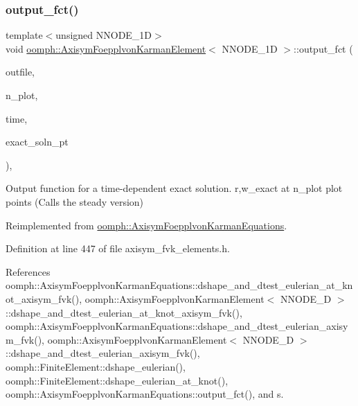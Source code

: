 \subsubsection{\texorpdfstring{output\+\_\+fct()}{output\_fct()}\hspace{0.1cm}{\footnotesize\ttfamily [2/4]}}
{\footnotesize\ttfamily template$<$unsigned N\+N\+O\+D\+E\+\_\+1D$>$ \\
void \hyperlink{classoomph_1_1AxisymFoepplvonKarmanElement}{oomph\+::\+Axisym\+Foepplvon\+Karman\+Element}$<$ N\+N\+O\+D\+E\+\_\+1D $>$\+::output\+\_\+fct (\begin{DoxyParamCaption}\item[{std\+::ostream \&}]{outfile,  }\item[{const unsigned \&}]{n\+\_\+plot,  }\item[{const double \&}]{time,  }\item[{\hyperlink{classoomph_1_1FiniteElement_ad4ecf2b61b158a4b4d351a60d23c633e}{Finite\+Element\+::\+Unsteady\+Exact\+Solution\+Fct\+Pt}}]{exact\+\_\+soln\+\_\+pt }\end{DoxyParamCaption})\hspace{0.3cm}{\ttfamily [inline]}, {\ttfamily [virtual]}}



Output function for a time-\/dependent exact solution. r,w\+\_\+exact at n\+\_\+plot plot points (Calls the steady version) 



Reimplemented from \hyperlink{classoomph_1_1AxisymFoepplvonKarmanEquations_a14d84273c5e7a3cdec8fb9b228d675c3}{oomph\+::\+Axisym\+Foepplvon\+Karman\+Equations}.



Definition at line 447 of file axisym\+\_\+fvk\+\_\+elements.\+h.



References oomph\+::\+Axisym\+Foepplvon\+Karman\+Equations\+::dshape\+\_\+and\+\_\+dtest\+\_\+eulerian\+\_\+at\+\_\+knot\+\_\+axisym\+\_\+fvk(), oomph\+::\+Axisym\+Foepplvon\+Karman\+Element$<$ N\+N\+O\+D\+E\+\_\+D $>$\+::dshape\+\_\+and\+\_\+dtest\+\_\+eulerian\+\_\+at\+\_\+knot\+\_\+axisym\+\_\+fvk(), oomph\+::\+Axisym\+Foepplvon\+Karman\+Equations\+::dshape\+\_\+and\+\_\+dtest\+\_\+eulerian\+\_\+axisym\+\_\+fvk(), oomph\+::\+Axisym\+Foepplvon\+Karman\+Element$<$ N\+N\+O\+D\+E\+\_\+D $>$\+::dshape\+\_\+and\+\_\+dtest\+\_\+eulerian\+\_\+axisym\+\_\+fvk(), oomph\+::\+Finite\+Element\+::dshape\+\_\+eulerian(), oomph\+::\+Finite\+Element\+::dshape\+\_\+eulerian\+\_\+at\+\_\+knot(), oomph\+::\+Axisym\+Foepplvon\+Karman\+Equations\+::output\+\_\+fct(), and s.

